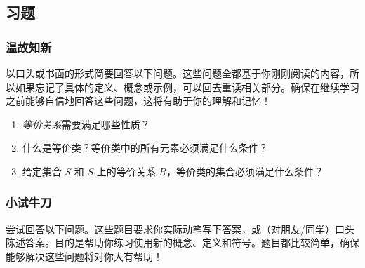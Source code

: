 
\subsection{习题}

\subsubsection*{温故知新}

以口头或书面的形式简要回答以下问题。这些问题全都基于你刚刚阅读的内容，所以如果忘记了具体的定义、概念或示例，可以回去重读相关部分。确保在继续学习之前能够自信地回答这些问题，这将有助于你的理解和记忆！

\begin{enumerate}[label=(\arabic*)]
    \item \emph{等价关系}需要满足哪些性质？
    \item 什么是等价类？等价类中的所有元素必须满足什么条件？
    \item 给定集合 $S$ 和 $S$ 上的等价关系 $R$，等价类的集合必须满足什么条件？
\end{enumerate}

\subsubsection*{小试牛刀}

尝试回答以下问题。这些题目要求你实际动笔写下答案，或（对朋友/同学）口头陈述答案。目的是帮助你练习使用新的概念、定义和符号。题目都比较简单，确保能够解决这些问题将对你大有帮助！

